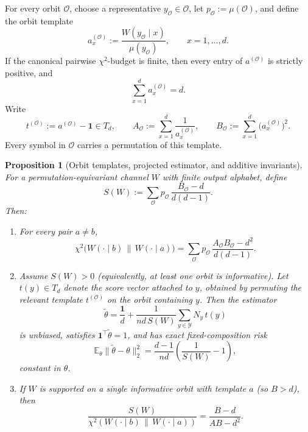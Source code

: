 \documentclass[11pt]{amsart}
\numberwithin{equation}{section}
\newtheorem{proposition}[theorem]{Proposition}
\theoremstyle{definition}
\newcommand{\E}{\mathbb E}
\newcommand{\one}{\mathbf 1}
\begin{document}
For every orbit \(\mathcal O\), choose a representative \(y_{\mathcal O}\in\mathcal O\),
let \(p_{\mathcal O}:=\mu(\mathcal O)\), and define the orbit template
\[
a^{(\mathcal O)}_x
:=
\frac{W(y_{\mathcal O}\mid x)}{\mu(y_{\mathcal O})},
\qquad x=1,\dots,d.
\]
If the canonical pairwise \(\chi^2\)-budget is finite, then every entry of \(a^{(\mathcal O)}\) is strictly
positive, and
\[
\sum_{x=1}^d a^{(\mathcal O)}_x=d. \tag{11.1}\label{eq:orbit-template-sum}
\]
Write
\[
t^{(\mathcal O)}:=a^{(\mathcal O)}-\one\in T_d,
\qquad
A_{\mathcal O}:=\sum_{x=1}^d \frac{1}{a_x^{(\mathcal O)}},
\qquad
B_{\mathcal O}:=\sum_{x=1}^d \bigl(a_x^{(\mathcal O)}\bigr)^2.
\]
Every symbol in \(\mathcal O\) carries a permutation of this template.

\begin{proposition}[Orbit templates, projected estimator, and additive invariants]\label{prop:orbit-template}
For a permutation-equivariant channel \(W\) with finite output alphabet, define
\[
S(W):=\sum_{\mathcal O} p_{\mathcal O}\,\frac{B_{\mathcal O}-d}{d(d-1)}. \tag{11.2}\label{eq:orbit-signal}
\]
Then:

\begin{enumerate}[label=\textup{(\roman*)}]
\item For every pair \(a\neq b\),
\[
\chi^2\!\bigl(W(\cdot\mid b)\,\|\,W(\cdot\mid a)\bigr)
=
\sum_{\mathcal O}
p_{\mathcal O}\,
\frac{A_{\mathcal O}B_{\mathcal O}-d^2}{d(d-1)}. \tag{11.3}\label{eq:orbit-budget}
\]

\item Assume \(S(W)>0\) (equivalently, at least one orbit is informative).
Let \(t(y)\in T_d\) denote the score vector attached to \(y\), obtained by permuting the relevant
template \(t^{(\mathcal O)}\) on the orbit containing \(y\).
Then the estimator
\[
\widetilde\theta
=
\frac{\one}{d}
+
\frac{1}{nd\,S(W)}
\sum_{y\in\mathcal Y} N_y\,t(y) \tag{11.4}\label{eq:orbit-estimator}
\]
is unbiased, satisfies \(\one^\top\widetilde\theta=1\), and has exact fixed-composition risk
\[
\E_\theta\|\widetilde\theta-\theta\|_2^2
=
\frac{d-1}{nd}\left(\frac{1}{S(W)}-1\right), \tag{11.5}\label{eq:orbit-risk}
\]
constant in \(\theta\).

\item If \(W\) is supported on a single informative orbit with template \(a\) (so \(B>d\)), then
\[
\frac{S(W)}{\chi^2(W(\cdot\mid b)\,\|\,W(\cdot\mid a))}
=
\frac{B-d}{AB-d^2}. \tag{11.6}\label{eq:orbit-slope}
\]
\end{enumerate}
\end{proposition}
\end{document}
